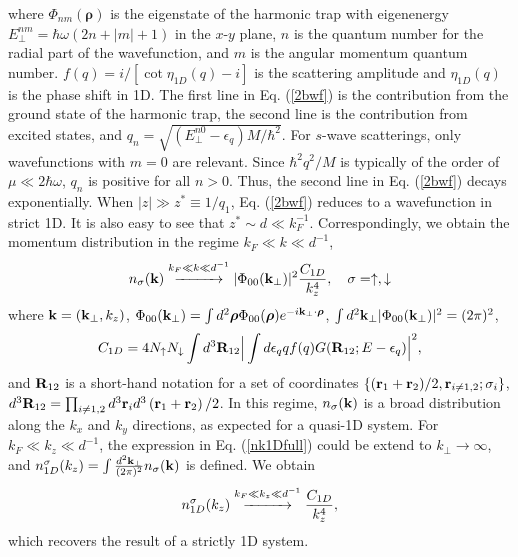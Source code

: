 \documentclass[twocolumn, prl]{revtex4}
\begin{document}
where $\Phi_{nm}({\bm \rho})$ is the eigenstate of the harmonic trap with eigenenergy $E_\bot^{nm}=\hbar\omega(2n+|m|+1)$ in the $x$-$y$ plane, $n$ is the quantum number for the radial part of the wavefunction, and  $m$ is the angular momentum quantum number. $f(q)=i/[\cot{\eta_{1D}(q)}-i]$ is the scattering amplitude and $\eta_{1D}(q)$ is the phase shift in 1D. The first line in Eq. (\ref{2bwf}) is the contribution from the ground state of the harmonic trap, the second line is the contribution from excited states, and $q_n=\sqrt{(E_\bot^{n0}-\epsilon_q)M/\hbar^2}$. For $s$-wave scatterings, only wavefunctions with $m=0$ are relevant. Since $\hbar^2q^2/M$ is typically of the order of $\mu\ll 2\hbar\omega$, $q_n$ is positive for all $n>0$. Thus, the second line in Eq. (\ref{2bwf}) decays exponentially. When $|z|\gg z^*\equiv 1/q_1$, Eq. (\ref{2bwf}) reduces to a wavefunction in strict 1D. It is also easy to see that $z^*\sim d\ll k_F^{-1}$. Correspondingly, we obtain the momentum distribution in the regime $k_F\ll k\ll d^{-1}$, 
\begin{equation}
n_\sigma({\bf k}) \stackrel{k_F\ll k\ll  d^{-1}}{\xrightarrow{\hspace*{1cm}} } |\Phi_{00}({\bf k}_\bot)|^2\frac{ C_{1D}}{k_z^{4}}, \quad \sigma=\uparrow,\downarrow \label{nk1Dfull}
\end{equation}
where ${\bf k}=({\bf k}_\bot, k_z) $, $\Phi_{00}({\bf k}_\bot)=\int d^2{\bm \rho} \Phi_{00}({\bm \rho}) e^{-i {\bf k_\bot} \cdot {\bm \rho}}$, $\int d^2 {\bf k}_\bot |\Phi_{00}({\bf k}_\bot)|^2=(2\pi)^2$,
\begin{equation}
C_{1D}=4N_{\uparrow}N_{\downarrow}\int d^3{\bf R}_{12}\Big|\int d\epsilon_q qf(q)G({\bf R}_{12};E-\epsilon_q)\Big|^2,\label{C1D}
\end{equation}
and ${\bf R}_{12}$ is a short-hand notation for a set of coordinates $\{({{\bf r}_1+{\bf r}_2})/{2}, {\bf r}_{i\neq 1,2}; \sigma_i\}$, $ d^3{\bf R}_{12}=\prod\nolimits_{i \ne 1,2} {{d^3}{{\bf r}_i}} {d^3}\left( {{{\bf r}_1} + {{\bf r}_2}} \right)/2$. In this regime, $n_\sigma({\bf k})$ is a broad distribution along the $k_x$ and $k_y$ directions, as expected for a quasi-1D system. For $k_F\ll k_z\ll d^{-1}$, the expression in Eq. (\ref{nk1Dfull}) could be extend to $k_{\bot}\rightarrow \infty$, and $n_{1D}^\sigma(k_z)=\int \frac{d^2{\bf k}_\bot}{(2\pi)^2} n_\sigma({\bf k})$ is defined. We obtain
\begin{equation}
n_{1D}^\sigma (k_z)\stackrel{k_F\ll k_z\ll d^{-1}}{\xrightarrow{\hspace*{1cm}} } \frac{C_{1D}}{k_z^4},\label{nk1D}
\end{equation}
which recovers the result of a strictly 1D system. 
\end{document}
